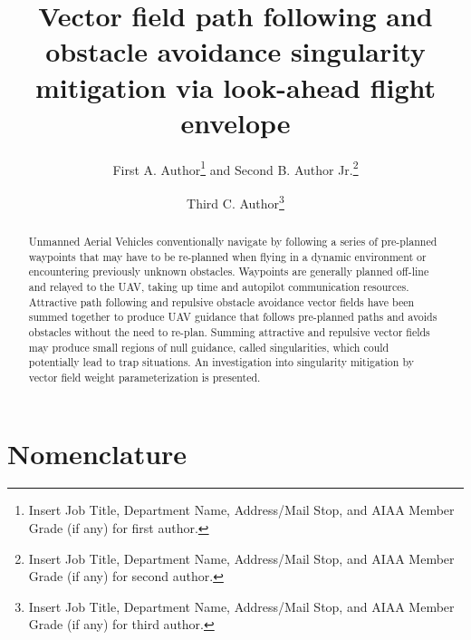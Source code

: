 \documentclass[conf]{new-aiaa}
\title{Vector field  path following and obstacle avoidance singularity mitigation via look-ahead flight envelope}
\author{First A. Author\footnote{Insert Job Title, Department Name, Address/Mail Stop, and AIAA Member Grade (if any) for first author.} and Second B. Author Jr.\footnote{Insert Job Title, Department Name, Address/Mail Stop, and AIAA Member Grade (if any) for second author.}}
\affil{Business or Academic Affiliation 1, City, State, Zip Code}
\author{Third C. Author\footnote{Insert Job Title, Department Name, Address/Mail Stop, and AIAA Member Grade (if any) for third author.}}
\begin{document}
\maketitle

\begin{abstract}



Unmanned Aerial Vehicles conventionally navigate by following a series of pre-planned waypoints that may have to be re-planned when flying in a dynamic environment or encountering previously unknown obstacles. Waypoints are generally planned off-line and relayed to the UAV, taking up time and autopilot communication resources. Attractive path following and repulsive obstacle avoidance vector fields have been summed together to produce UAV guidance that follows pre-planned paths and avoids obstacles without the need to re-plan. Summing attractive and repulsive vector fields may produce small regions of null guidance, called singularities, which could potentially lead to trap situations. An investigation into singularity mitigation by vector field weight parameterization is presented. 


\end{abstract}



\section{Nomenclature}
\end{document}
